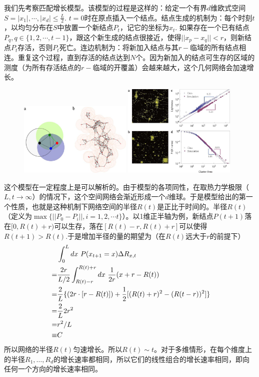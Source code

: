 我们先考察匹配增长模型\cite{zhang2015scaling}。该模型的过程是这样的：给定一个有界\(d\)维欧式空间\(S=|x_1|,\cdots,|x_d|\leq \frac{L}{2}.\) \(t=0\)时在原点插入一个结点。结点生成的机制为：每个时刻\(t\)，以均匀分布在\(S\)中放置一个新结点\(P_t\)，记它的坐标为\(x_t.\) 如果存在一个已有结点\(P_q,q\in\{1,2,\cdots,t-1\}\)，跟这个新生成的结点很接近，使得\(||x_p-x_q||< r\)，则新结点\(P_t\)存活，否则\(P_t\)死亡。连边机制为：将新加入结点与其\(r-\)临域的所有结点相连。重复这个过程，直到存活的结点达到\(N\)个。因为新加入的结点可生存的区域的测度（为所有存活结点的\(r-\)临域的开覆盖）会越来越大，这个几何网络会加速增长。
\begin{figure}
    \centering
    \includegraphics[width = 0.48\textwidth]{pictures/srep09767-f1.jpg}
    \includegraphics[width = 0.48\textwidth]{pictures/srep09767-f3.jpg}
\end{figure}

这个模型在一定程度上是可以解析的。由于模型的各项同性，在取热力学极限（$L,t\rightarrow\infty$）的情况下，这个空间网络会渐近形成一个$d$维球。于是模型给出的第一个性质，也就是这种机制下网络空间的半径$R(t)$是正比于时间的。半径\(R(t)\)（定义为\(\max\{||P_0-P_i||,i=1,2,\cdots t\}\)）。以1维正半轴为例，新结点\(P(t+1)\)落在\([0,R(t)+r)\)可以生存，落在\([R(t)-r,R(t)+r]\)可以使得\(R(t+1)> R(t).\)于是增加半径的量的期望为（在\(R(t)\)远大于\(r\)的前提下）
\begin{align}
  &\int_0^Ldx\ P(x_{t+1}=x)\Delta R_{x,t}\notag\\
  =& \frac{2r}{L/2}\int_{R(t)-r}^{R(t)+r} dx\ \frac{1}{2r} (x+r-R(t))\notag\\
  =& \frac{2}{L} \{(2r\cdot [r-R(t)]) +\frac{1}{2}[(R(t)+r)^2-(R(t-r))^2] \}\notag\\
  =& \frac{2}{L} 2r^2\notag\\
  =&r^2/L\notag\\\
  \equiv& C 
\end{align}
所以网络的半径\(R(t)\)匀速增长。所以\(R(t)\sim t\)。对于多维情形，在每个维度上的半径\(R_1,\ldots,R_d\)的增长速率都相同，所以它们的线性组合的增长速率相同，即向任何一个方向的增长速率相同。

